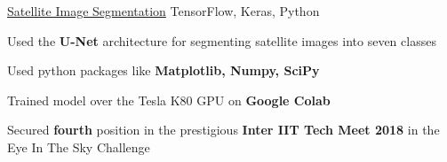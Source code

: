 

\begin{cventries}


  \projects
    {} %
    {\href{https://github.com/Nilanshrajput/interiit_techmeet}{Satellite Image Segmentation}} %
    {TensorFlow, Keras, Python} %
    {} %
    {
      \begin{cvitems} %
        \item {Used the \textbf{U-Net} architecture for segmenting satellite images into seven classes}
        \item {Used python packages like \textbf{Matplotlib, Numpy, SciPy}}
        \item {Trained model over the Tesla K80 GPU on \textbf{Google Colab}}
        \item {Secured \textbf{fourth} position in the prestigious \textbf{Inter IIT Tech Meet 2018} in the Eye In The Sky Challenge}
      \end{cvitems}
    }


\end{cventries}
